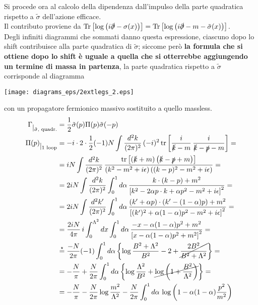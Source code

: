 \documentclass[a4paper,11pt]{amsart}
\newcommand{\sigmatilde}{\tilde{\sigma}}
\newcommand{\de}[1]{\frac{d^2#1}{(2\pi)^2}}
\DeclareMathOperator{\Tr}{Tr}
\DeclareMathOperator{\tr}{tr}
\begin{document}
 Si procede ora al calcolo della dipendenza dall'impulso della parte quadratica rispetto a $\sigmatilde$ dell'azione efficace.\\
 Il contributo proviene da $\Tr \left[\log\left(i\slashed{\partial} -  \sigma(x)\right)\right] = \Tr \left[\log\left(i\slashed{\partial} - m - \sigmatilde(x)\right)\right]$.\\
 Degli infiniti diagrammi che sommati danno questa espressione, ciascuno dopo lo shift contribuisce alla parte quadratica  di $\sigmatilde$; 
 siccome però \textbf{la formula che si ottiene dopo lo shift è uguale a quella che si otterrebbe aggiungendo un termine di massa in partenza}, la parte quadratica rispetto a $\sigmatilde$ corrisponde al diagramma \\
 \begin{center}\texttt{[image: diagrams\_eps/2extlegs\_2.eps]}\end{center}
 con un propagatore fermionico massivo sostituito a quello massless.
 \begin{align*}
  \Gamma\raisebox{-0.15cm}{$|_{\sigmatilde\text{, quadr.}}$} &= \frac{1}{2}\sigmatilde(p)\Pi(p)\sigmatilde(-p)\\
  \Pi(p)\raisebox{-0.15cm}{$|_{\text{1 loop}}$} & = -i\cdot 2\cdot\frac{1}{2}(-1)N \int \de{k}\, (-i)^2 \tr\left[ \frac{i}{\slashed{k}-m}\,\frac{i}{\slashed{k}-\slashed{p}-m} \right] = \\
  & = iN \int\de{k}\,\frac{\tr\left[\left(\slashed{k}+m\right)\left(\slashed{k}-\slashed{p}+m\right)\right]}{\left(k^2-m^2+i\epsilon\right)\left((k-p)^2-m^2+i\epsilon\right)} = \\
  & = 2iN \int\de{k} \int_0^1 d\alpha\, \frac{k\cdot (k-p)+m^2}{\left[k^2-2\alpha p\cdot k + \alpha p^2 -m^2 + i\epsilon\right]^2} = \\
  & = 2iN \int\de{k'} \int_0^1 d\alpha\, \frac{(k'+\alpha p)\cdot (k'-(1-\alpha )p) + m^2}{\left[(k')^2 + \alpha (1 - \alpha ) p^2 -m^2 + i \epsilon \right]^2} = \\
  & = \frac{2iN}{4\pi}\,i \int_0^{\Lambda^2} dx \int_0^1 d\alpha\,\frac{-x -\alpha (1 - \alpha ) p^2 + m^2}{\left[x - \alpha (1 - \alpha ) p^2 + m^2 \right]^2} = \\
  & \stackrel{\star}{=} \frac{-N}{2\pi} (-1) \int_0^1 d\alpha\left\{\log \frac{ B^2 + \Lambda^2}{B^2} -2 + \cancel{\frac{2B^2}{B^2 + \Lambda^2}}\right\} =  \\
  & = -\frac{N}{\pi} + \frac{N}{2\pi}\int_0^1 d\alpha \left\{\log\frac{\Lambda^2}{B^2} + \cancel{\log \left(1+\frac{B^2}{\Lambda^2}\right)}  \right\} = \\
  & = -\frac{N}{\pi} - \frac{N}{2\pi}\log \frac{m^2}{\Lambda^2} - \frac{N}{2\pi}\int_0^1 d\alpha\, \log \left( 1 - \alpha (1 - \alpha ) \frac{p^2}{m^2} \right) 
 \end{align*}
\end{document}
